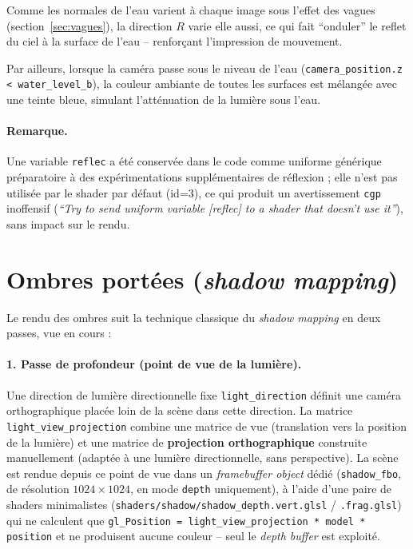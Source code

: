 \documentclass[11pt,a4paper]{article}
\begin{document}
Comme les normales de l'eau varient à chaque image sous l'effet des
vagues (section~\ref{sec:vagues}), la direction $R$ varie elle aussi,
ce qui fait ``onduler'' le reflet du ciel à la surface de l'eau --
renforçant l'impression de mouvement.

Par ailleurs, lorsque la caméra passe sous le niveau de l'eau
(\texttt{camera\_position.z < water\_level\_b}), la couleur ambiante de
toutes les surfaces est mélangée avec une teinte bleue, simulant
l'atténuation de la lumière sous l'eau.

\paragraph{Remarque.} Une variable \texttt{reflec} a été conservée dans
le code comme uniforme générique préparatoire à des expérimentations
supplémentaires de réflexion ; elle n'est pas utilisée par le shader
par défaut (id=3), ce qui produit un avertissement \texttt{cgp}
inoffensif (\emph{``Try to send uniform variable [reflec] to a shader
that doesn't use it''}), sans impact sur le rendu.

\section{Ombres portées (\emph{shadow mapping})}
\label{sec:ombres}

Le rendu des ombres suit la technique classique du \emph{shadow
mapping} en deux passes, vue en cours :

\paragraph{1. Passe de profondeur (point de vue de la lumière).}
Une direction de lumière directionnelle fixe \texttt{light\_direction}
définit une caméra orthographique placée loin de la scène dans cette
direction. La matrice \texttt{light\_view\_projection} combine une
matrice de vue (translation vers la position de la lumière) et une
matrice de \textbf{projection orthographique} construite manuellement
(adaptée à une lumière directionnelle, sans perspective). La scène est
rendue depuis ce point de vue dans un \emph{framebuffer object} dédié
(\texttt{shadow\_fbo}, de résolution $1024\times 1024$, en mode
\texttt{depth} uniquement), à l'aide d'une paire de shaders minimalistes
(\texttt{shaders/shadow/shadow\_depth.vert.glsl} /
\texttt{.frag.glsl}) qui ne calculent que
\texttt{gl\_Position = light\_view\_projection * model * position} et
ne produisent aucune couleur -- seul le \emph{depth buffer} est
exploité.
\end{document}
